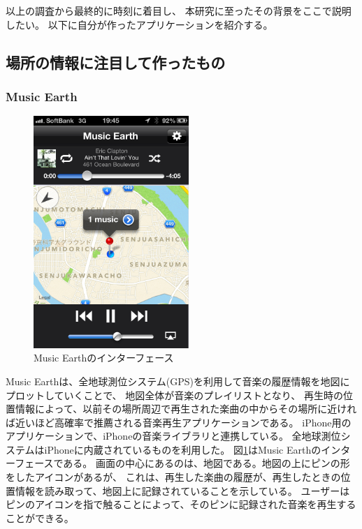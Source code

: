 \documentclass[a4paper, 11pt, onecolumn, report]{jsarticle}
\begin{document}
以上の調査から最終的に時刻に着目し、
本研究に至ったその背景をここで説明したい。
以下に自分が作ったアプリケーションを紹介する。

\subsection{場所の情報に注目して作ったもの}


\subsubsection{Music Earth}

\begin{figure}[h]
\begin{center}
\includegraphics[width=5.866cm]{musicEarth.png}
\caption{Music Earthのインターフェース}
\label{musicEarth_interface}
\end{center}
\end{figure}
Music Earthは、全地球測位システム(GPS)を利用して音楽の履歴情報を地図にプロットしていくことで、
地図全体が音楽のプレイリストとなり、
再生時の位置情報によって、以前その場所周辺で再生された楽曲の中からその場所に近ければ近いほど高確率で推薦される音楽再生アプリケーションである。
iPhone用のアプリケーションで、iPhoneの音楽ライブラリと連携している。
全地球測位システムはiPhoneに内蔵されているものを利用した。
図\ref{musicEarth_interface}はMusic Earthのインターフェースである。
画面の中心にあるのは、地図である。地図の上にピンの形をしたアイコンがあるが、
これは、再生した楽曲の履歴が、再生したときの位置情報を読み取って、地図上に記録されていることを示している。
ユーザーはピンのアイコンを指で触ることによって、そのピンに記録された音楽を再生することができる。
\end{document}
